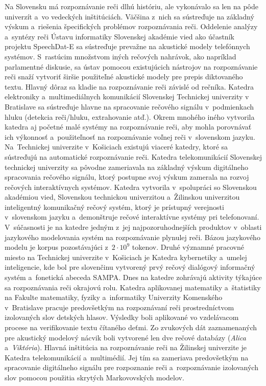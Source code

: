 \begin{multicols}{2}
Na Slovensku má rozpoznávanie reči dlhú históriu, ale vykonávalo sa len na pôde univerzít a~vo vedeckých inštitúciách. Väčšina z~nich sa sústreďuje na základný výskum a~riešenia špecifických problémov rozpoznávania reči. Oddelenie analýzy a~syntézy reči Ústavu informatiky Slovenskej akadémie vied ako účastník projektu SpeechDat-E sa sústreďuje prevažne na akustické modely telefónnych systémov. S~rastúcim množstvom iných rečových nahrávok, ako napríklad parlamentné diskusie, sa ústav pomocou existujúcich nástrojov na rozpoznávanie reči snaží vytvoriť širšie použiteľné akustické modely pre  prepis diktovaného textu. Hlavný dôraz sa kladie na rozpoznávanie reči závislé od rečníka. Katedra elektroniky a~multimediálnych komunikácií Slovenskej Technickej univerzity v Bratislave sa sústreďuje hlavne na spracovanie rečového signálu v~podmienkach hluku (detekcia reči/hluku, extrahovanie atď.). Okrem mnohého iného vytvorila katedra aj početné malé systémy na rozpoznávanie reči, aby mohla porovnávať ich výkonnosť a~použiteľnosť na rozpoznávanie voľnej reči v~slovenskom jazyku. Na~Technickej univerzite v~Košiciach existujú viaceré katedry, ktoré sa sústreďujú na automatické rozpoznávanie reči. Katedra telekomunikácií Slovenskej technickej univerzity sa pôvodne zameriavala na základný výskum digitálneho spracovania rečového signálu, ktorý postupne svoj výskum zamerala na rozvoj rečových interaktívnych systémov.
\newline Katedra vytvorila v~spolupráci so Slovenskou akadémiou vied, Slovenskou technickou univerzitou a~Žilinskou univerzitou inteligentný komunikačný rečový systém, ktorý je prístupný verejnosti v~slovenskom jazyku a~demonštruje rečové interaktívne systémy pri telefonovaní. V~súčasnosti je na katedre jedným z~jej najpozoruhodnejších produktov v~oblasti jazykového modelovania systém na rozpoznávanie plynulej reči. Bázou jazykového modelu  je korpus pozostávajúci z~$2\cdot 10^9$ tokenov. 
\newline Druhé významné pracovné miesto na Technickej univerzite v~Košiciach je Katedra kybernetiky a~umelej inteligencie, kde bol pre slovenčinu vytvorený prvý rečový dialógový informačný systém a~fonetická abeceda SAMPA. Dnes na katedre zohrávajú aktivity týkajúce sa rozpoznávania reči okrajovú rolu. Katedra aplikovanej matematiky a~štatistiky na Fakulte matematiky, fyziky a~informatiky Univerzity Komenského v~Bratislave pracuje predovšetkým na rozpoznávaní reči prostredníctvom izolovaných slov detských hlasov. Výsledky boli aplikované vo vzdelávacom procese na verifikovanie textu čítaného deťmi. Zo zvukových dát zaznamenaných pre akustický modelový nácvik boli vytvorené len dve rečové databázy (\emph{Alica} a~\emph{Viktória}).  Hlavná inštitúcia na rozpoznávanie reči na Žilinskej univerzite je Katedra telekomunikácií a~multimédií. Jej tím sa zameriava predovšetkým na spracovanie digitálneho signálu pre rozpoznanie reči a~rozpoznávanie izolovaných slov pomocou použitia skrytých Markovovských modelov.


\end{multicols}
